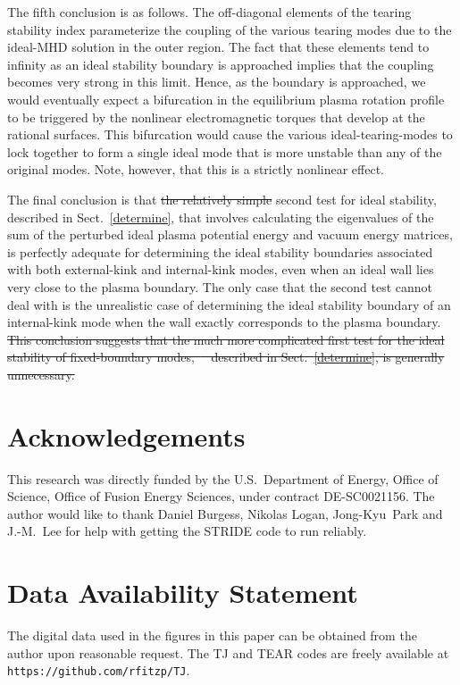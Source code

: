 \documentclass[12pt,prb,aps]{revtex4-1}
\providecommand{\DIFadd}[1]{{\protect\color{blue}\uwave{#1}}} %
\providecommand{\DIFdel}[1]{{\protect\color{red}\sout{#1}}}                      %
\providecommand{\DIFaddbegin}{} %
\providecommand{\DIFaddend}{} %
\providecommand{\DIFdelbegin}{} %
\providecommand{\DIFdelend}{} %
\newcommand{\DIFscaledelfig}{0.5}
\newlength{\DIFdelgraphicswidth} %
\newlength{\DIFdelgraphicsheight} %
\newcommand{\DIFaddincludegraphics}[2][]{{\color{blue}\fbox{\DIFOincludegraphics[#1]{#2}}}} %
\newcommand{\DIFdelincludegraphics}[2][]{%
\sbox{\DIFdelgraphicsbox}{\DIFOincludegraphics[#1]{#2}}%
\settoboxwidth{\DIFdelgraphicswidth}{\DIFdelgraphicsbox} %
\settoboxtotalheight{\DIFdelgraphicsheight}{\DIFdelgraphicsbox} %
\scalebox{\DIFscaledelfig}{%
\parbox[b]{\DIFdelgraphicswidth}{\usebox{\DIFdelgraphicsbox}\\[-\baselineskip] \rule{\DIFdelgraphicswidth}{0em}}\llap{\resizebox{\DIFdelgraphicswidth}{\DIFdelgraphicsheight}{%
\setlength{\unitlength}{\DIFdelgraphicswidth}%
\begin{picture}(1,1)%
\thicklines\linethickness{2pt} %
{\color[rgb]{1,0,0}\put(0,0){\framebox(1,1){}}}%
{\color[rgb]{1,0,0}\put(0,0){\line( 1,1){1}}}%
{\color[rgb]{1,0,0}\put(0,1){\line(1,-1){1}}}%
\end{picture}%
}\hspace*{3pt}}} %
} %
\DeclareRobustCommand{\DIFaddbegin}{\DIFOaddbegin \let\includegraphics\DIFaddincludegraphics} %
\DeclareRobustCommand{\DIFaddend}{\DIFOaddend \let\includegraphics\DIFOincludegraphics} %
\DeclareRobustCommand{\DIFdelbegin}{\DIFOdelbegin \let\includegraphics\DIFdelincludegraphics} %
\DeclareRobustCommand{\DIFdelend}{\DIFOaddend \let\includegraphics\DIFOincludegraphics} %
\begin{document}
The fifth conclusion is as follows. The off-diagonal elements of the tearing stability index parameterize the coupling of the
various tearing modes due to the ideal-MHD solution in the outer region. The fact that these elements tend to infinity as
an ideal stability boundary is approached implies that the coupling becomes very strong in this limit. Hence, as the boundary is
approached, we would eventually expect  a bifurcation in the equilibrium plasma  rotation profile to be triggered  by the nonlinear electromagnetic
torques that develop at the rational surfaces.\cite{am1,bif} This bifurcation would cause the various ideal-tearing-modes to
lock together to form a single ideal mode that is more unstable than any of the original modes. Note, however,  that this is a strictly nonlinear effect. 

The final conclusion is that \DIFdelbegin \DIFdel{the relatively simple }\DIFdelend \DIFaddbegin \DIFadd{our }\DIFaddend second test for ideal stability, \DIFaddbegin \DIFadd{which is }\DIFaddend described in Sect.~\ref{determine}, \DIFaddbegin \DIFadd{and which }\DIFaddend that involves calculating
the eigenvalues of the sum of the perturbed ideal plasma potential energy and vacuum energy matrices,\cite{dcon} is perfectly adequate for
determining the ideal stability boundaries associated with both external-kink and internal-kink modes, even when an ideal wall lies
very close to the plasma boundary. The only case that the second test cannot deal with is the unrealistic case of determining
the ideal stability boundary of an internal-kink mode when the wall exactly corresponds to the plasma boundary. 
\DIFdelbegin \DIFdel{This conclusion  suggests
that the much more complicated first test for the ideal stability of fixed-boundary modes,\mbox{%
\cite{dcon} }\hskip0pt%
described in Sect.~\ref{determine}, is generally unnecessary. 
}\DIFdelend 

\section*{Acknowledgements}
This research was directly funded by the U.S.\ Department of Energy, Office of Science, Office of Fusion Energy Sciences, under  contract DE-SC0021156. 
The author would like to thank Daniel Burgess, Nikolas Logan, Jong-Kyu~Park and J.-M.~Lee for help with getting the STRIDE code to
run reliably. 

\section*{Data Availability Statement}
The digital data used in the figures in this paper can be obtained from the author upon reasonable request. The TJ and TEAR codes are freely 
available at {\tt https://github.com/rfitzp/TJ}. 
\end{document}
